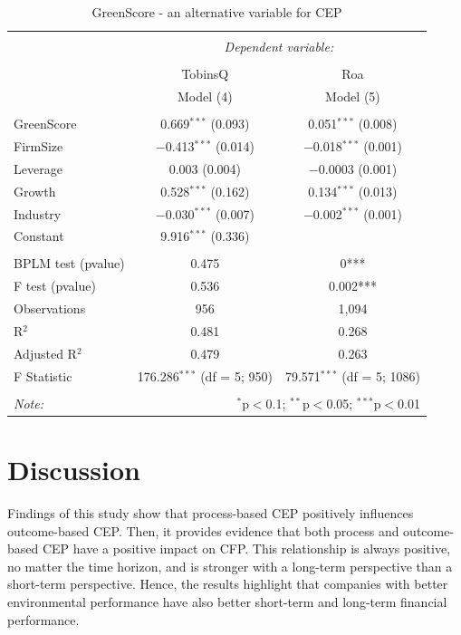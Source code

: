 \documentclass[12pt,]{article}
\begin{document}
\newpage

\begin{table}[!] \centering 
  \caption{GreenScore - an alternative variable for CEP} 
  \label{GreenScoreResults} 
\begin{tabular}{@{\extracolsep{5pt}}lcc} 
\\[-1.8ex]\hline 
\hline \\[-1.8ex] 
 & \multicolumn{2}{c}{\textit{Dependent variable:}} \\ 
\cline{2-3} 
\\[-1.8ex] & TobinsQ & Roa \\ 
 & Model (4) & Model (5) \\ 
\hline \\[-1.8ex] 
 GreenScore & 0.669$^{***}$ (0.093) & 0.051$^{***}$ (0.008) \\ 
  FirmSize & $-$0.413$^{***}$ (0.014) & $-$0.018$^{***}$ (0.001) \\ 
  Leverage & 0.003 (0.004) & $-$0.0003 (0.001) \\ 
  Growth & 0.528$^{***}$ (0.162) & 0.134$^{***}$ (0.013) \\ 
  Industry & $-$0.030$^{***}$ (0.007) & $-$0.002$^{***}$ (0.001) \\ 
  Constant & 9.916$^{***}$ (0.336) &  \\ 
 \hline \\[-1.8ex] 
BPLM test (pvalue) & 0.475 & 0*** \\ 
F test (pvalue) & 0.536 & 0.002*** \\ 
Observations & 956 & 1,094 \\ 
R$^{2}$ & 0.481 & 0.268 \\ 
Adjusted R$^{2}$ & 0.479 & 0.263 \\ 
F Statistic & 176.286$^{***}$ (df = 5; 950) & 79.571$^{***}$ (df = 5; 1086) \\ 
\hline 
\hline \\[-1.8ex] 
\textit{Note:}  & \multicolumn{2}{r}{$^{*}$p$<$0.1; $^{**}$p$<$0.05; $^{***}$p$<$0.01} \\ 
\end{tabular} 
\end{table}

\FloatBarrier
\newpage
{}

\section{Discussion}\label{discussion}

Findings of this study show that process-based CEP positively influences
outcome-based CEP. Then, it provides evidence that both process and
outcome-based CEP have a positive impact on CFP. This relationship is
always positive, no matter the time horizon, and is stronger with a
long-term perspective than a short-term perspective. Hence, the results
highlight that companies with better environmental performance have also
better short-term and long-term financial performance.
\end{document}
